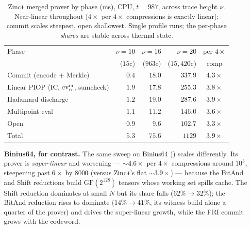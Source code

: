 \begin{table}[h]
\centering
\renewcommand{\arraystretch}{1.2}
\begin{tabular}{l r r r c}
\toprule
Phase & $\nu{=}10$ & $\nu{=}16$ & $\nu{=}20$ & per $4\times$ \\
      & ($15$c) & ($963$c) & ($15{,}420$c) & comp \\
\midrule
Commit (encode $+$ Merkle)          & $0.4$ & $18.0$ & $337.9$ & $4.3\times$ \\
Linear PIOP (IC, $\operatorname{ev}^{\mathrm{m}}_{\alpha}$, sumcheck) & $1.9$ & $17.8$ & $255.3$ & $3.8\times$ \\
Hadamard discharge                  & $1.2$ & $19.0$ & $287.6$ & $3.9\times$ \\
Multipoint eval                     & $1.1$ & $11.2$ & $146.0$ & $3.6\times$ \\
Open                                & $0.9$ & $9.6$  & $102.7$ & $3.3\times$ \\
\midrule
Total                               & $5.3$ & $75.6$ & $1129$  & $3.9\times$ \\
\bottomrule
\end{tabular}
\caption{Zinc\texttt{+} merged prover by phase (ms), CPU, $t=987$, across trace
height $\nu$. Near-linear throughout ($4\times$ per $4\times$ compressions is
exactly linear); commit scales steepest, open shallowest. Single profile runs;
the per-phase \emph{shares} are stable across thermal state.}
\label{tab:perphase}
\end{table}

\medskip
\noindent\textbf{Binius64, for contrast.} The same sweep on Binius64
() scales differently. Its prover is
\emph{super-linear} and worsening --- $\sim\!4.6\times$ per $4\times$
compressions around $10^3$, steepening past $6\times$ by $8000$ (versus
Zinc\texttt{+}'s flat $\sim\!3.9\times$) --- because the BitAnd and Shift
reductions build $\mathrm{GF}(2^{128})$ tensors whose working set spills
cache. The Shift reduction dominates at small $N$ but its share falls
($62\%\!\to\!32\%$); the BitAnd reduction rises to dominate
($14\%\!\to\!41\%$, its witness build alone a quarter of the prover) and
drives the super-linear growth, while the FRI commit grows with the codeword.

